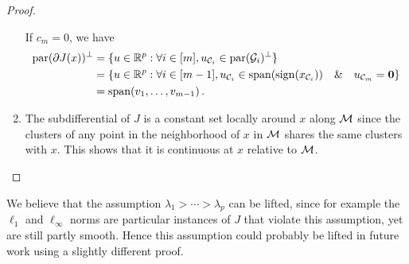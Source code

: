 \begin{proof}
\begin{enumerate}
		      If $c_m=0$, we have
		      \begin{equation}
			      \begin{aligned}
				      \operatorname{par}(\partial J(x))^\perp & = \{ u \in \mathbb{R}^p : \forall i \in [m], u_{\mathcal{C}_i} \in \operatorname{par} (\mathcal{G}_i)^\perp \}                                             \\
				                                   & = \{ u \in \mathbb{R}^p : \forall i \in [m- 1], u_{\mathcal{C}_i} \in \operatorname{span}(\operatorname{sign}(x_{\mathcal{C}_i}))  \quad  \& \quad u_{\mathcal{C}_m} = \mathbf{0}\} \\
				                                   & = \operatorname{span}(v_1, \ldots, v_{m-1}) \, .
			      \end{aligned}
		      \end{equation}
		\item The subdifferential of $J$ is a constant set locally around $x$ along $\mathcal{M}$ since the clusters of any point in the neighborhood of $x$ in $\mathcal{M}$ shares the same clusters with $x$.
		      This shows that it is continuous at $x$ relative to $\mathcal{M}$.
	\end{enumerate}
\end{proof}

\begin{remark}
	We believe that the assumption $\lambda_1 > \cdots > \lambda_p$ can be lifted, since for example the $\ell_1$ and $\ell_\infty$ norms are particular instances of $J$ that violate this assumption, yet are still partly smooth.
	Hence this assumption could probably be lifted in future work using a slightly different proof.
\end{remark}
